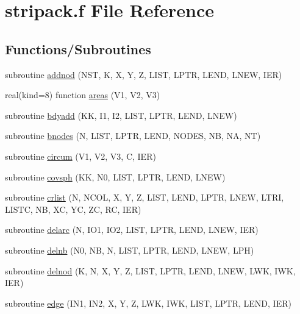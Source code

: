 \hypertarget{stripack_8f}{\section{stripack.\+f File Reference}
\label{stripack_8f}
}
\subsection*{Functions/\+Subroutines}
\begin{DoxyCompactItemize}
\item 
subroutine \hyperlink{stripack_8f_abeb97081337b4be18ec3c8a3fc544218}{addnod} (N\+S\+T, K, X, Y, Z, L\+I\+S\+T, L\+P\+T\+R, L\+E\+N\+D, L\+N\+E\+W, I\+E\+R)
\item 
real(kind=8) function \hyperlink{stripack_8f_af59ae0b420fb4b671c413f763c95af4e}{areas} (V1, V2, V3)
\item 
subroutine \hyperlink{stripack_8f_adb777ec06721f35643c8a11de174a113}{bdyadd} (K\+K, I1, I2, L\+I\+S\+T, L\+P\+T\+R, L\+E\+N\+D, L\+N\+E\+W)
\item 
subroutine \hyperlink{stripack_8f_a432a46b8ec2a1a53c6cb9156251f6804}{bnodes} (N, L\+I\+S\+T, L\+P\+T\+R, L\+E\+N\+D, N\+O\+D\+E\+S, N\+B, N\+A, N\+T)
\item 
subroutine \hyperlink{stripack_8f_ad0ac0aba8f3e07fa3a40362d59870e31}{circum} (V1, V2, V3, C, I\+E\+R)
\item 
subroutine \hyperlink{stripack_8f_a714ca9e379aed630c81c51ac99f6a43d}{covsph} (K\+K, N0, L\+I\+S\+T, L\+P\+T\+R, L\+E\+N\+D, L\+N\+E\+W)
\item 
subroutine \hyperlink{stripack_8f_a2dd8278a86e0133804e4f63ac0b08819}{crlist} (N, N\+C\+O\+L, X, Y, Z, L\+I\+S\+T, L\+E\+N\+D, L\+P\+T\+R, L\+N\+E\+W, L\+T\+R\+I, L\+I\+S\+T\+C, N\+B, X\+C, Y\+C, Z\+C, R\+C, I\+E\+R)
\item 
subroutine \hyperlink{stripack_8f_afcf1c56f47d51ec6cf1d8800eaf528ba}{delarc} (N, I\+O1, I\+O2, L\+I\+S\+T, L\+P\+T\+R, L\+E\+N\+D, L\+N\+E\+W, I\+E\+R)
\item 
subroutine \hyperlink{stripack_8f_a3e279c86a8f8a5d42a9c466c9eb8e8de}{delnb} (N0, N\+B, N, L\+I\+S\+T, L\+P\+T\+R, L\+E\+N\+D, L\+N\+E\+W, L\+P\+H)
\item 
subroutine \hyperlink{stripack_8f_af21123213fd83b4ec3fd61cc419a8642}{delnod} (K, N, X, Y, Z, L\+I\+S\+T, L\+P\+T\+R, L\+E\+N\+D, L\+N\+E\+W, L\+W\+K, I\+W\+K, I\+E\+R)
\item 
subroutine \hyperlink{stripack_8f_a7c67c1abdd492ae2083e0987b57f2eb6}{edge} (I\+N1, I\+N2, X, Y, Z, L\+W\+K, I\+W\+K, L\+I\+S\+T, L\+P\+T\+R, L\+E\+N\+D, I\+E\+R)

\end{DoxyCompactItemize}
